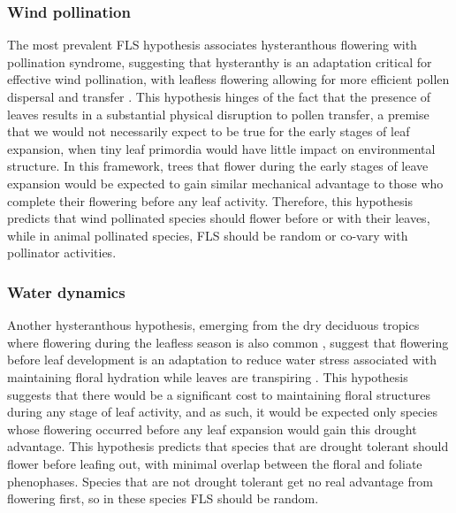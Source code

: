 \documentclass[12pt]{article}\usepackage[]{graphicx}\usepackage[]{color}
\begin{document}
\subsubsection*{ Wind pollination}
\indent\indent The most prevalent FLS hypothesis associates hysteranthous flowering with pollination syndrome, suggesting that hysteranthy is an adaptation critical for effective wind pollination, with leafless flowering allowing for more efficient pollen dispersal and transfer \citep{Whitehead1969, Spurr1980,Friedman2009}. %
 This hypothesis hinges of the fact that the presence of leaves results in a substantial physical disruption to pollen transfer, a premise that we would not necessarily expect to be true for the early stages of leaf expansion, when tiny leaf primordia would have little impact on environmental structure. %
In this framework, trees that flower during the early stages of leave expansion would be expected to gain similar mechanical advantage to those who complete their flowering before any leaf activity. Therefore, this hypothesis predicts that wind pollinated species should flower before or with their leaves, while in animal pollinated species, FLS should be random or co-vary with pollinator activities.
\subsubsection*{Water dynamics}
\indent\indent Another hysteranthous hypothesis, emerging from the dry deciduous tropics where flowering during the leafless season is also common \citep{Janzen1967}, suggest that flowering before leaf development is an adaptation to reduce water stress associated with maintaining floral hydration while leaves are transpiring \citep{Franklin2016}. %
This hypothesis suggests that there would be a significant cost to maintaining floral structures during any stage of leaf activity, and as such, it would be expected only species whose flowering occurred before any leaf expansion would gain this drought advantage. This hypothesis predicts that species that are drought tolerant should flower before leafing out, with minimal overlap between the floral and foliate phenophases. Species that are not drought tolerant get no real advantage from flowering first, so in these species FLS should be random. %
\end{document}
